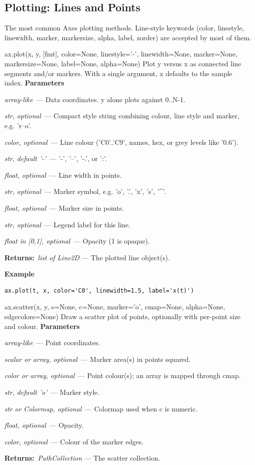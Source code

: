 \documentclass[10pt]{article}
\newenvironment{params}
  {\smallskip\textbf{\small\color{accent}Parameters}\par\nopagebreak
   \begin{description}[leftmargin=1.3em,itemsep=1.5pt,parsep=0pt,topsep=1pt,
      labelindent=0pt,style=sameline,font=\normalfont]}
  {\end{description}}
\newcommand{\pitem}[3]{\item[{\ttfamily\color{accent}#1}]{\itshape #2}\ --- #3}
\newcommand{\preturn}[2]{\smallskip\textbf{\small\color{accent}Returns:}\ {\itshape #1} --- #2\par}
\begin{document}
\subsection{Plotting: Lines and Points}
The most common Axes plotting methods. Line-style keywords (color, linestyle, linewidth, marker, markersize, alpha, label, zorder) are accepted by most of them.

\begin{func}{ax.plot(x, y, [fmt], color=None, linestyle='-', linewidth=None, marker=None, markersize=None, label=None, alpha=None)}
Plot y versus x as connected line segments and/or markers. With a single argument, x defaults to the sample index.
\begin{params}
\pitem{x, y}{array-like}{Data coordinates. y alone plots against 0..N-1.}
\pitem{fmt}{str, optional}{Compact style string combining colour, line style and marker, e.g. 'r--o'.}
\pitem{color}{color, optional}{Line colour ('C0'..'C9', names, hex, or grey levels like '0.6').}
\pitem{linestyle}{str, default '-'}{'-', '--', '-.', or ':'.}
\pitem{linewidth}{float, optional}{Line width in points.}
\pitem{marker}{str, optional}{Marker symbol, e.g. 'o', '.', 'x', 's', '\textasciicircum{}'.}
\pitem{markersize}{float, optional}{Marker size in points.}
\pitem{label}{str, optional}{Legend label for this line.}
\pitem{alpha}{float in [0,1], optional}{Opacity (1 is opaque).}
\end{params}
\preturn{list of Line2D}{The plotted line object(s).}
\smallskip\textbf{\small\color{accent}Example}
\begin{lstlisting}[style=py]
ax.plot(t, x, color='C0', linewidth=1.5, label='x(t)')
\end{lstlisting}
\end{func}
\medskip

\begin{func}{ax.scatter(x, y, s=None, c=None, marker='o', cmap=None, alpha=None, edgecolors=None)}
Draw a scatter plot of points, optionally with per-point size and colour.
\begin{params}
\pitem{x, y}{array-like}{Point coordinates.}
\pitem{s}{scalar or array, optional}{Marker area(s) in points squared.}
\pitem{c}{color or array, optional}{Point colour(s); an array is mapped through cmap.}
\pitem{marker}{str, default 'o'}{Marker style.}
\pitem{cmap}{str or Colormap, optional}{Colormap used when c is numeric.}
\pitem{alpha}{float, optional}{Opacity.}
\pitem{edgecolors}{color, optional}{Colour of the marker edges.}
\end{params}
\preturn{PathCollection}{The scatter collection.}
\end{func}
\medskip
\end{document}
